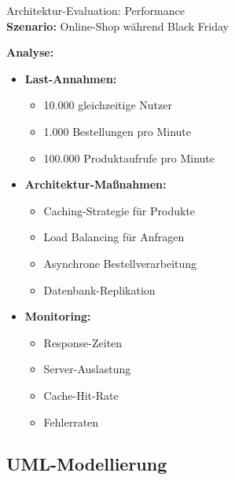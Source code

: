 \begin{example2}{Architektur-Evaluation: Performance}\\
\textbf{Szenario:} Online-Shop während Black Friday

\textbf{Analyse:}
\begin{itemize}
    \item \textbf{Last-Annahmen:}
    \begin{itemize}
        \item 10.000 gleichzeitige Nutzer
        \item 1.000 Bestellungen pro Minute
        \item 100.000 Produktaufrufe pro Minute
    \end{itemize}
    
    \item \textbf{Architektur-Maßnahmen:}
    \begin{itemize}
        \item Caching-Strategie für Produkte
        \item Load Balancing für Anfragen
        \item Asynchrone Bestellverarbeitung
        \item Datenbank-Replikation
    \end{itemize}
    
    \item \textbf{Monitoring:}
    \begin{itemize}
        \item Response-Zeiten
        \item Server-Auslastung
        \item Cache-Hit-Rate
        \item Fehlerraten
    \end{itemize}
\end{itemize}
\end{example2}

\pagebreak

\subsection{UML-Modellierung}

